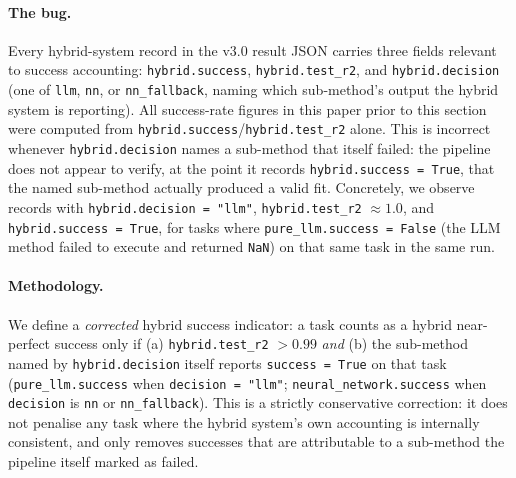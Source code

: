 \documentclass[twoside,11pt]{article}
\begin{document}
\paragraph{The bug.} Every hybrid-system record in the v3.0 result JSON carries
three fields relevant to success accounting: \texttt{hybrid.success},
\texttt{hybrid.test\_r2}, and \texttt{hybrid.decision} (one of \texttt{llm},
\texttt{nn}, or \texttt{nn\_fallback}, naming which sub-method's output the
hybrid system is reporting). All success-rate figures in this paper prior to
this section were computed from \texttt{hybrid.success}/\texttt{hybrid.test\_r2}
alone. This is incorrect whenever \texttt{hybrid.decision} names a sub-method
that itself failed: the pipeline does not appear to verify, at the point it
records \texttt{hybrid.success = True}, that the named sub-method actually
produced a valid fit. Concretely, we observe records with
\texttt{hybrid.decision = "llm"}, \texttt{hybrid.test\_r2} $\approx 1.0$, and
\texttt{hybrid.success = True}, for tasks where \texttt{pure\_llm.success =
False} (the LLM method failed to execute and returned \texttt{NaN}) on that
same task in the same run.

\paragraph{Methodology.} We define a \emph{corrected} hybrid success indicator:
a task counts as a hybrid near-perfect success only if (a)
\texttt{hybrid.test\_r2} $> 0.99$ \emph{and} (b) the sub-method named by
\texttt{hybrid.decision} itself reports \texttt{success = True} on that task
(\texttt{pure\_llm.success} when \texttt{decision = "llm"};
\texttt{neural\_network.success} when \texttt{decision} is \texttt{nn} or
\texttt{nn\_fallback}). This is a strictly conservative correction: it does
not penalise any task where the hybrid system's own accounting is internally
consistent, and only removes successes that are attributable to a sub-method
the pipeline itself marked as failed.
\end{document}
